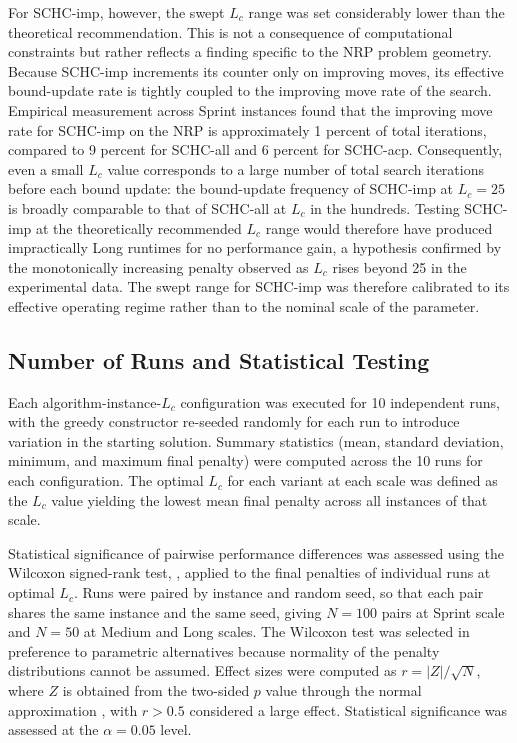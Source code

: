\documentclass[12pt, a4paper, oneside]{report}
\begin{document}
\noindent For SCHC-imp, however, the swept $L_c$ range was set
considerably lower than the theoretical recommendation. This is not
a consequence of computational constraints but rather reflects a
finding specific to the NRP problem geometry. Because SCHC-imp
increments its counter only on improving moves, its effective
bound-update rate is tightly coupled to the improving move rate of
the search. Empirical measurement across Sprint instances found that
the improving move rate for SCHC-imp on the NRP is approximately 1
percent of total iterations, compared to 9 percent for SCHC-all
and 6 percent for SCHC-acp. Consequently, even a small $L_c$ value
corresponds to a large number of total search iterations before each
bound update: the bound-update frequency of SCHC-imp at $L_c = 25$
is broadly comparable to that of SCHC-all at $L_c$ in the hundreds.
Testing SCHC-imp at the theoretically recommended $L_c$ range would
therefore have produced impractically Long runtimes for no
performance gain, a hypothesis confirmed by the monotonically
increasing penalty observed as $L_c$ rises beyond 25 in the
experimental data. The swept range for SCHC-imp was therefore
calibrated to its effective operating regime rather than to the
nominal scale of the parameter.

\subsection{Number of Runs and Statistical Testing}
\label{sec:stats}

Each algorithm-instance-$L_c$ configuration was executed for 10
independent runs, with the greedy constructor re-seeded randomly for
each run to introduce variation in the starting solution. Summary
statistics (mean, standard deviation, minimum, and maximum final
penalty) were computed across the 10 runs for each configuration.
The optimal $L_c$ for each variant at each scale was defined as the
$L_c$ value yielding the lowest mean final penalty across all
instances of that scale.

Statistical significance of pairwise performance differences was
assessed using the Wilcoxon signed-rank test, \citet{Wilcoxon1945},
applied to the final penalties of individual runs at optimal $L_c$.
Runs were paired by instance and random seed, so that each pair
shares the same instance and the same seed, giving $N = 100$ pairs at
Sprint scale and $N = 50$ at Medium and Long scales. The Wilcoxon
test was selected in preference to parametric alternatives because
normality of the penalty distributions cannot be assumed. Effect
sizes were computed as $r = |Z|/\sqrt{N}$, where $Z$ is obtained from
the two-sided $p$ value through the normal approximation
\citep{Fritz2012}, with $r > 0.5$ considered a large effect. Statistical significance was assessed at the $\alpha = 0.05$
level.
\end{document}
